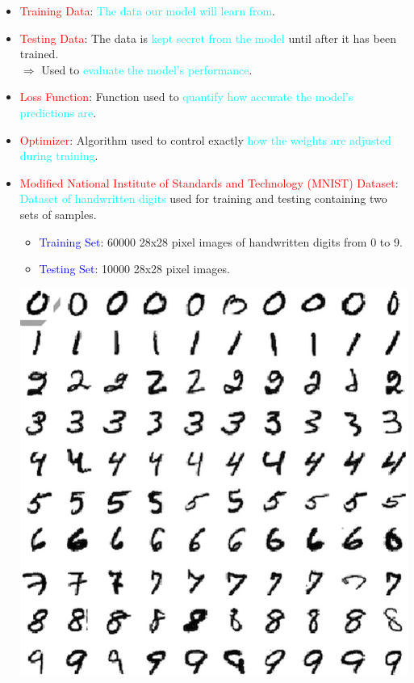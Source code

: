 \documentclass{book}
\begin{document}
\begin{itemize}
    \item \textcolor{red}{Training Data}: \textcolor{cyan}{The data our model will learn from}.
    \item \textcolor{red}{Testing Data}: The data is \textcolor{cyan}{kept secret from the model} until after it has been trained.\\
    $\Rightarrow$ Used to \textcolor{cyan}{evaluate the model's performance}.
    \item \textcolor{red}{Loss Function}: Function used to \textcolor{cyan}{quantify how accurate the model's predictions are}.
    \item \textcolor{red}{Optimizer}: Algorithm used to control exactly \textcolor{cyan}{how the weights are adjusted during training}.
    \item \textcolor{red}{Modified National Institute of Standards and Technology (MNIST) Dataset}: \textcolor{cyan}{Dataset of handwritten digits} used for training and testing containing two sets of samples.
    \begin{itemize}
        \item \textcolor{blue}{Training Set}: 60000 28x28 pixel images of handwritten digits from 0 to 9.
        \item \textcolor{blue}{Testing Set}: 10000 28x28 pixel images.
    \end{itemize}
    \begin{center}
        \includegraphics[scale=0.3]{chapter 7/ch7_figure12.jpeg}
    \end{center}
\end{itemize}
\newpage
\end{document}
